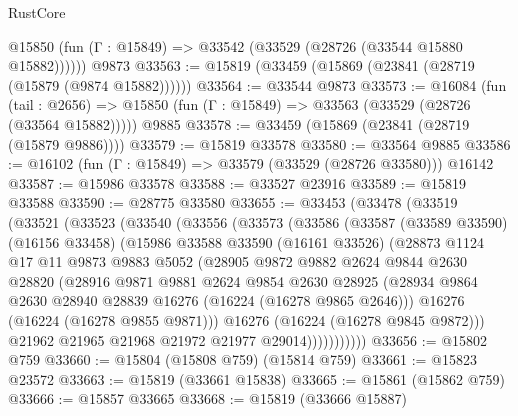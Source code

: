 \begin{lexlean}{RustCore}
\begin{coremodule}
      @15850 (fun (Γ : @15849) => @33542 (@33529 (@28726 (@33544 @15880 @15882))))))
    @9873
@33563 := @15819 (@33459 (@15869 (@23841 (@28719 (@15879 (@9874 @15882))))))
@33564 := @33544 @9873
@33573 := @16084
    (fun (tail : @2656) => @15850 (fun (Γ : @15849) => @33563 (@33529 (@28726 (@33564 @15882)))))
    @9885
@33578 := @33459 (@15869 (@23841 (@28719 (@15879 @9886))))
@33579 := @15819 @33578
@33580 := @33564 @9885
@33586 := @16102 (fun (Γ : @15849) => @33579 (@33529 (@28726 @33580))) @16142
@33587 := @15986 @33578
@33588 := @33527 @23916
@33589 := @15819 @33588
@33590 := @28775 @33580
@33655 := @33453
    (@33478
      (@33519
        (@33521
          (@33523
            (@33540
              (@33556
                (@33573
                  (@33586
                    (@33587
                      (@33589 @33590)
                      (@16156 @33458)
                      (@15986
                        @33588
                        @33590
                        (@16161 @33526)
                        (@28873
                          @1124
                          @17
                          @11
                          @9873
                          @9883
                          @5052
                          (@28905
                            @9872
                            @9882
                            @2624
                            @9844
                            @2630
                            @28820
                            (@28916
                              @9871
                              @9881
                              @2624
                              @9854
                              @2630
                              @28925
                              (@28934
                                @9864
                                @2630
                                @28940
                                @28839
                                @16276
                                (@16224 (@16278 @9865 @2646)))
                              @16276
                              (@16224 (@16278 @9855 @9871)))
                            @16276
                            (@16224 (@16278 @9845 @9872)))
                          @21962
                          @21965
                          @21968
                          @21972
                          @21977
                          @29014)))))))))))
@33656 := @15802 @759
@33660 := @15804 (@15808 @759) (@15814 @759)
@33661 := @15823 @23572
@33663 := @15819 (@33661 @15838)
@33665 := @15861 (@15862 @759)
@33666 := @15857 @33665
@33668 := @15819 (@33666 @15887)

\end{coremodule}
\end{lexlean}
